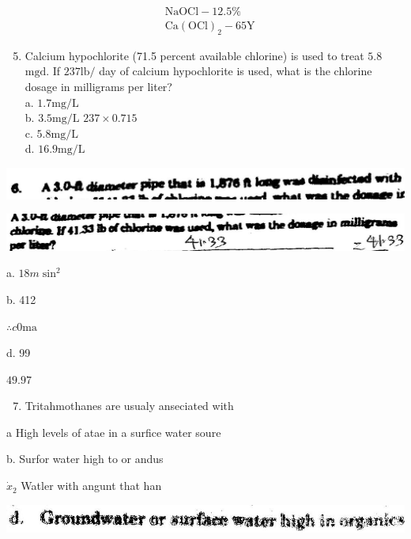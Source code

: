 \documentclass[10pt]{article}
\begin{document}
$$
\begin{aligned}
&\mathrm{NaOCl}-12.5 \% \\
&\mathrm{Ca}(\mathrm{OCl})_{2}-65 \mathrm{Y}
\end{aligned}
$$

\begin{enumerate}
  \setcounter{enumi}{4}
  \item Calcium hypochlorite (71.5 percent available chlorine) is used to treat $5.8$ $\mathrm{mgd}$. If $237 \mathrm{lb} /$ day of calcium hypochlorite is used, what is the chlorine dosage in milligrams per liter?\\
a. $1.7 \mathrm{mg} / \mathrm{L}$\\
b. $3.5 \mathrm{mg} / \mathrm{L}$ $237 \times 0.715$\\
c. $5.8 \mathrm{mg} / \mathrm{L}$\\
d. $16.9 \mathrm{mg} / \mathrm{L}$
\end{enumerate}

\includegraphics[max width=\textwidth]{2022_11_11_ca6a6c1a0324ee23e523g-52}

\includegraphics[max width=\textwidth]{2022_11_11_ca6a6c1a0324ee23e523g-52(1)}

a. $18 m \sin ^{2}$

b. 412

$\therefore c 0 \mathrm{ma}$

d. 99

$49.97$

\begin{enumerate}
  \setcounter{enumi}{6}
  \item Tritahmothanes are usualy anseciated with
\end{enumerate}

a High levels of atae in a surfice water soure

b. Surfor water high to or andus

$\dot{x}_{2}$ Watler with angunt that han

\includegraphics[max width=\textwidth]{2022_11_11_ca6a6c1a0324ee23e523g-52(2)}
\end{document}
